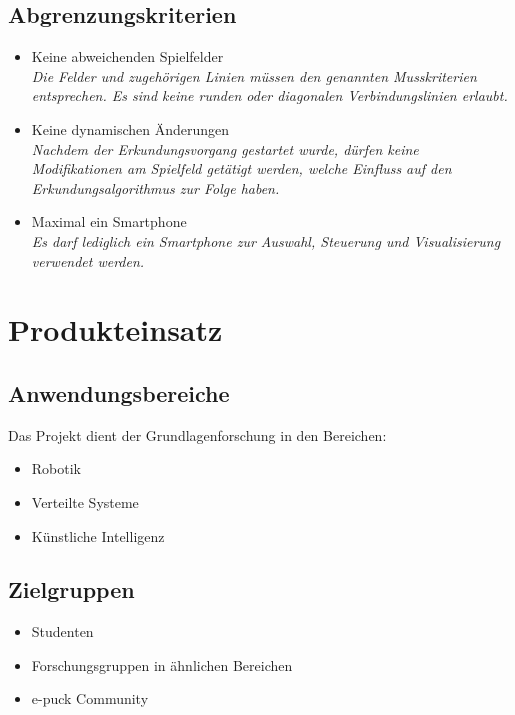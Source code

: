 \documentclass[10pt,a4paper]{article}
\begin{document}
		\subsection{Abgrenzungskriterien}
			\begin{itemize}
				\item Keine abweichenden Spielfelder
					\\ \textsl{Die Felder und zugehörigen Linien müssen den genannten Musskriterien
						entsprechen. Es sind keine runden oder diagonalen Verbindungslinien erlaubt.}
				\item Keine dynamischen Änderungen
					\\ \textsl{Nachdem der Erkundungsvorgang gestartet wurde, dürfen keine Modifikationen am
						Spielfeld getätigt werden, welche Einfluss auf den Erkundungsalgorithmus zur Folge haben.}			
				\item Maximal ein Smartphone
					\\ \textsl{Es darf lediglich ein Smartphone zur Auswahl, Steuerung und Visualisierung verwendet
						werden.}		
			\end{itemize}
	\section{Produkteinsatz}
		\subsection{Anwendungsbereiche}
			Das Projekt dient der Grundlagenforschung in den Bereichen:
			\begin{itemize}
				\item Robotik
				\item Verteilte Systeme
				\item Künstliche Intelligenz
			\end{itemize}
		\subsection{Zielgruppen}
			\begin{itemize}
				\item Studenten
				\item Forschungsgruppen in ähnlichen Bereichen
				\item e-puck Community
			\end{itemize}
\end{document}
